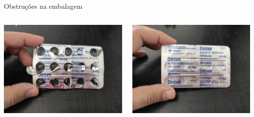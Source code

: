 \begin{frame}{Obstruções na embalagem}
	\centering
	\begin{columns}
		\begin{column}{0.5\textwidth}
			\centering
			\includegraphics[width=\textwidth]{../pictures/IMG_20240725_110209.jpg}
		\end{column}
		\begin{column}{0.5\textwidth}
			\centering
			\includegraphics[width=\textwidth]{../pictures/IMG_20240725_110238.jpg}
		\end{column}
	\end{columns}
\end{frame}
